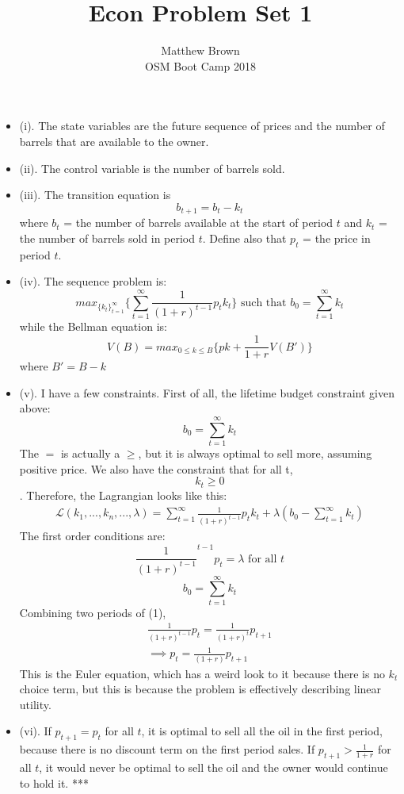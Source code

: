 \documentclass[12pt]{article}
\newenvironment{problem}[2][Problem]{\begin{trivlist}
\item[\hskip \labelsep {\bfseries #1}\hskip \labelsep {\bfseries #2.}]}{\end{trivlist}}
\theoremstyle{definition}
\theoremstyle{definition}
\theoremstyle{definition}
\theoremstyle{definition}
\begin{document}
\title{Econ Problem Set 1}
\author{Matthew Brown\\ 
OSM Boot Camp 2018} %
 
\maketitle
 
\begin{problem}{1}
\begin{itemize}
\item (i). The state variables are the future sequence of prices and the number of barrels that are available to the owner.
\item (ii). The control variable is the number of barrels sold.
\item (iii). The transition equation is 
$$ b_{t+1} = b_t - k_t $$
where $b_t$ = the number of barrels available at the start of period $t$ and $k_t$ = the number of barrels sold in period $t$. Define also that $p_t$ = the price in period $t$.
\item (iv). The sequence problem is:
$$ max_{\{k_t\}_{t=1}^\infty} \bigg\{ \sum_{t=1}^{\infty} \frac{1}{(1+r)^{t-1}}p_tk_t \bigg\} \text{ such that } b_0 = \sum_{t=1}^\infty k_t  $$
while the Bellman equation is:
$$ V(B) = max_{0 \leq k \leq B} \bigg\{ pk + \frac{1}{1+r}V(B') \bigg\} $$
where $B' = B-k$
\item (v). I have a few constraints. First of all, the lifetime budget constraint given above:
$$b_0 = \sum_{t=1}^\infty k_t$$ 
The $=$ is actually a $\geq$, but it is always optimal to sell more, assuming positive price. 
We also have the constraint that for all t, 
$$k_t \geq 0$$. Therefore, the Lagrangian looks like this:
\begin{align*}
\mathcal{L}(k_1, ..., k_n, ..., \lambda) = \sum_{t=1}^\infty \frac{1}{(1+r)^{t-1}}p_tk_t +\lambda(b_0 - \sum_{t=1}^\infty k_t)
\end{align*}
The first order conditions are:
\begin{equation}
\frac{1}{(1+r)^{t-1}}^{t-1}p_t = \lambda \text{ for all } t
\end{equation}
\begin{equation}
b_0 = \sum_{t=1}^\infty k_t
\end{equation}
Combining two periods of (1), \begin{align*}
\frac{1}{(1+r)^{t-1}}p_t = \frac{1}{(1+r)^{t}}p_{t+1} \\
\implies p_t = \frac{1}{(1+r)}p_{t+1}
\end{align*}
This is the Euler equation, which has a weird look to it because there is no $k_t$ choice term, but this is because the problem is effectively describing linear utility.
\item (vi). If $p_{t+1} = p_t$ for all $t$, it is optimal to sell all the oil in the first period, because there is no discount term on the first period sales. If $p_{t+1} > \frac{1}{1+r}$ for all $t$, it would never be optimal to sell the oil and the owner would continue to hold it. ***
\end{itemize}
\end{problem}
\end{document}
